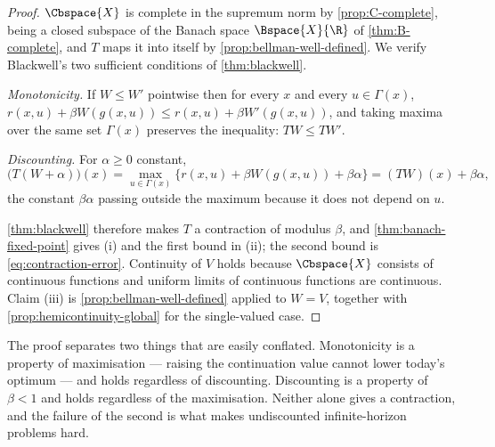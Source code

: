 \begin{proof}
	$\Cbspace{X}$ is complete in the supremum norm by \autoref{prop:C-complete},
	being a closed subspace of the Banach space $\Bspace{X}{\R}$ of
	\autoref{thm:B-complete}, and $T$ maps it into itself by
	\autoref{prop:bellman-well-defined}. We verify Blackwell's two sufficient
	conditions of \autoref{thm:blackwell}.

	\emph{Monotonicity.} If $W\leq W'$ pointwise then for every $x$ and every
	$u\in\Gamma(x)$,
	$r(x,u)+\beta W(g(x,u))\leq r(x,u)+\beta W'(g(x,u))$, and taking maxima over the
	same set $\Gamma(x)$ preserves the inequality: $TW\leq TW'$.

	\emph{Discounting.} For $\alpha\geq0$ constant,
	\[
		\bigl(T(W+\alpha)\bigr)(x)
		=\max_{u\in\Gamma(x)}\bigl\{r(x,u)+\beta W(g(x,u))+\beta\alpha\bigr\}
		=(TW)(x)+\beta\alpha,
	\]
	the constant $\beta\alpha$ passing outside the maximum because it does not
	depend on $u$.

	\autoref{thm:blackwell} therefore makes $T$ a contraction of modulus $\beta$,
	and \autoref{thm:banach-fixed-point} gives (i) and the first bound in (ii); the
	second bound is \eqref{eq:contraction-error}. Continuity of $V$ holds because
	$\Cbspace{X}$ consists of continuous functions and uniform limits of
	continuous functions are continuous. Claim (iii) is
	\autoref{prop:bellman-well-defined} applied to $W=V$, together with
	\autoref{prop:hemicontinuity-global} for the single-valued case.
\end{proof}

The proof separates two things that are easily conflated. Monotonicity is a
property of maximisation --- raising the continuation value cannot lower today's
optimum --- and holds regardless of discounting. Discounting is a property of
$\beta<1$ and holds regardless of the maximisation. Neither alone gives a
contraction, and the failure of the second is what makes undiscounted
infinite-horizon problems hard.

